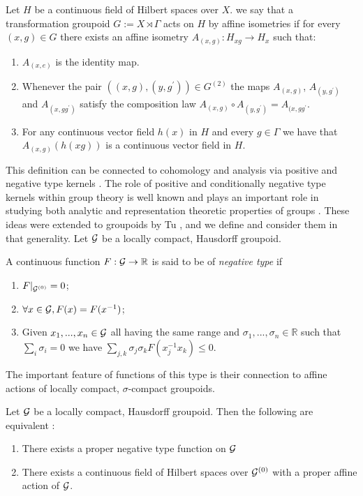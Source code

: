 \begin{definition}
Let $H$ be a continuous field of Hilbert spaces over $X$. we say that a transformation groupoid $G:=X\rtimes \Gamma$ acts on $H$ by affine isometries if for every $(x,g) \in G$ there exists an affine isometry $A_{(x,g)}:H_{xg}\rightarrow H_{x}$ such that:
\begin{enumerate}
\item $A_{(x,e)}$ is the identity map.
\item Whenever the pair $((x,g),(y,g^{'})) \in G^{(2)}$ the maps $A_{(x,g)}$, $A_{(y,g^{'})}$ and $A_{(x,gg^{'})}$ satisfy the composition law $A_{(x,g)}\circ A_{(y,g^{'})}=A_{(x,gg^{'}}$.
\item For any continuous vector field $h(x)$ in $H$ and every $g \in \Gamma$ we have that $A_{(x,g)}(h(xg))$ is a continuous vector field in $H$.
\end{enumerate}
\end{definition}

This definition can be connected to cohomology and analysis via positive and negative type kernels \cite{MR2415834,MR2158394}. The role of positive and conditionally negative type kernels within group theory is well known and plays an important role in studying both analytic and representation theoretic properties of groups \cite{MR2415834,MR1487204}. These ideas were extended to groupoids by Tu \cite{MR1703305}, and we define and consider them in that generality. Let $\mathcal{G}$ be a locally compact, Hausdorff groupoid.

\begin{definition}
A continuous function $F: \mathcal{G} \rightarrow \mathbb{R}$ is said to be of \textit{negative type} if 
\begin{enumerate}
\item $F|_{\mathcal{G}^{(0)}}=0$;
\item $\forall x \in \mathcal{G}, F(x)=F(x^{-1})$;
\item Given $x_{1},...,x_{n} \in \mathcal{G}$ all having the same range and $\sigma_{1},...,\sigma_{n} \in \mathbb{R}$ such that $\sum_{i}\sigma_{i}=0$ we have $\sum_{j,k}\sigma_{j}\sigma_{k}F(x_{j}^{-1}x_{k})\leq 0$.
\end{enumerate}
\end{definition}

The important feature of functions of this type is their connection to affine actions of locally compact, $\sigma$-compact groupoids.
\begin{theorem}\label{thm:Haag}Let $\mathcal{G}$ be a locally compact, Hausdorff groupoid. Then the following are equivalent \cite{MR1703305}:
\begin{enumerate}
\item There exists a proper negative type function on $\mathcal{G}$
\item There exists a continuous field of Hilbert spaces over $\mathcal{G}^{(0)}$ with a proper affine action of $\mathcal{G}$.
\end{enumerate}
\end{theorem}

